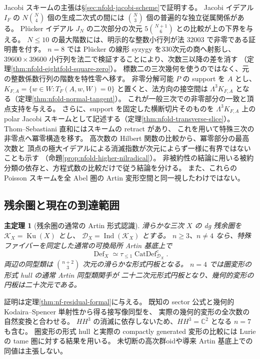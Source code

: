 \documentclass[11pt,a4paper]{ltjsarticle}
\numberwithin{equation}{section}
\newtheorem{maintheorem}{主定理}
\newcommand{\C}{\mathbb C}
\begin{document}
Jacobi スキームの主張は\S\ref{sec:nfold-jacobi-scheme}で証明する。
Jacobi イデアル $I_F$ の $N\binom N4$ 個の生成二次式の間には
$\binom N3$ 個の普遍的な独立従属関係がある。
Pl\"ucker イデアル $J_N$ の二次部分の次元 $5\binom{N+1}{6}$ との比較が上の下界を与える。
$N\le10$ の最大階数には、明示的な整数小行列が法 $32003$ で非零である証明書を付す。
$n=8$ では Pl\"ucker の線形 syzygy を330次元の商へ射影し、
$39600\times39600$ 小行列を法二で検証することにより、次数三以降の差を消す
（定理\ref{thm:nfold-eightfold-square-zero}）。
標数二の三次幾何を使うのではなく、元の整数係数行列の階数を特性零へ移す。
非零分解可能 $P$ の support を $A$ とし、
$K_{F,A}=\{w\in W:T_F(A,w,W)=0\}$ と置くと、法方向の接空間は
$\Lambda^3K_{F,A}$ となる（定理\ref{thm:nfold-normal-tangent}）。
これが一般三次での非零部分の一致と頂点支持を与える。
さらに、support を固定した横断切片そのものを $\Lambda^3K_{F,A}$ 上の
polar Jacobi スキームとして記述する（定理\ref{thm:nfold-transverse-slice}）。
Thom--Sebastiani 直和にはスキームの retract があり、
これを用いて特殊三次の非零点へ冪零構造を移す。
高次数の Hilbert 関数の比較から、冪零部分の最高次数と
頂点の極大イデアルによる消滅指数が次元によらず一様に有界ではないことも示す
（命題\ref{prop:nfold-higher-nilradical}）。
非被約性の結論に用いる被約分類の依存と、方程式数の比較だけで従う結論を分ける。
また、これらの Poisson スキームを全 Abel 圏の Artin 変形空間と同一視したわけではない。

\subsection{残余圏と現在の到達範囲}
\begin{maintheorem}[残余圏の通常の Artin 形式認識]
滑らかな三次 $X$ の dg 残余圏を $\mathcal K_X=\operatorname{Ku}(X)$ とし、
$\mathcal D_X=\operatorname{Ind}(\mathcal K_X)$ とする。
$n\ge3$、$n\ne4$ なら、特殊ファイバーを同定した通常の可換局所 Artin 基底上で
\[
 \operatorname{Def}_X\simeq
 \tau_{\le1}\operatorname{CatDef}^{c}_{\mathcal D_X}.
\]
両辺の同型類は $\binom{n+2}{3}$ 次元の滑らかな形式円板となる。
$n=4$ では圏変形の形式 hull の通常 Artin 同型類関手が
二十二次元形式円板となり、幾何的変形の円板は二十次元である。
\end{maintheorem}

証明は定理\ref{thm:nf-residual-formal}に与える。
既知の sector 公式と幾何的 Kodaira--Spencer 単射性から得る接写像同型を、
実際の幾何的変形の全次数の自然変換と合わせる。
$HH^3$ の消滅に依存しないため、$HH^3=\C^2$ となる $n=7$ も含む。
圏変形の形式 hull と実際の compactly generated 変形の比較には
Lurie \cite{NFDAGX} の tame 圏に対する結果を用いる。
未切断の高次群oidや導来 Artin 基底上での同値は主張しない。
\end{document}
